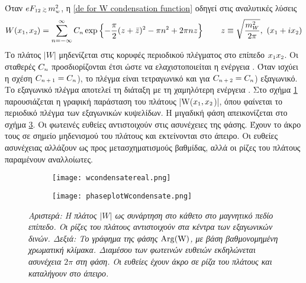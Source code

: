 Όταν $eF\subscr{12}\,{\scriptscriptstyle\gtrsim}\,m\subscr{w}\superscr{2}$, η \eqref{de for W condensation function} οδηγεί στις αναλυτικές λύσεις
\begin{equation}\label{w condensate solution}
    W(x\subscr{1},x\subscr{2})= \sum\limits_{n=-\infty}^{\infty}C\subscr{n}\exp\left\{-\frac{\pi}{2}(z+\bar{z})\superscr{2}-\pi n\superscr{2}+2\pi nz\right\}\qquad z\equiv \sqrt{\frac{m\superscr{2}\subscr{W}}{2\pi}},\,\,(x\subscr{1}+ix\subscr{2})
\end{equation}
Το πλάτος $|W|$ μηδενίζεται στις κορυφές περιοδικού πλέγματος στο επίπεδο $x\subscr{1}x\subscr{2}$. Οι σταθερές $C\subscr{n}$ προσδιορίζονται έτσι ώστε να ελαχιστοποιείται η ενέργεια \cite{chernodub}. 
Όταν ισχύει η σχέση $C\subscr{n+1}=C\subscr{n}$), το πλέγμα είναι τετραγωνικό και για $C\subscr{n+2}=C\subscr{n}$) εξαγωνικό.  
Το εξαγωνικό πλέγμα αποτελεί τη διάταξη με τη χαμηλότερη ενέργεια \cite{PhysRevD.45.3833}. Στο σχήμα \ref{fig:W condensate abs} παρουσιάζεται η γραφική παράσταση του πλάτους |W($x\subscr{1},x\subscr{2}$)|, όπου φαίνεται το περιοδικό πλέγμα των εξαγωνικών κυψελίδων. 
Η μιγαδική φάση  
απεικονίζεται 
στο σχήμα \ref{fig:W condensate phase}. Οι φωτεινές ευθείες αντιστοιχούν στις ασυνέχειες της φάσης. Έχουν το άκρο τους σε σημείο μηδενισμού του πλάτους και εκτείνονται στο άπειρο. Οι  %
ευθείες ασυνέχειας αλλάζουν ως προς μετασχηματισμούς βαθμίδας, αλλά οι ρίζες του πλάτους παραμένουν αναλλοίωτες.
\begin{english}
\begin{figure}[t] 
    \centering
    \begin{subfigure}[t]{0.54\textwidth}
        \texttt{[image: wcondensatereal.png]}
        \caption{}
        \label{fig:W condensate abs}
    \end{subfigure}
    \hfill
    \begin{subfigure}[t]{0.45\textwidth}
        \texttt{[image: phaseplotWcondensate.png]}
        \caption{}
        \label{fig:W condensate phase}
    \end{subfigure}
    \caption{\textit{Αριστερά: Η πλάτος $|W|$ ως συνάρτηση στο κάθετο στο μαγνητικό πεδίο επίπεδο. Οι ρίζες του πλάτους αντιστοιχούν στα κέντρα των εξαγωνικών δινών. Δεξιά: Το γράφημα της φάσης $\rm{Arg}(W)$, με βάση βαθμονομημένη χρωματική κλίμακα. Διαμέσου των φωτεινών ευθειών εκδηλώνεται ασυνέχεια $2\pi$ στη φάση. Οι ευθείες έχουν άκρο σε ρίζα του πλάτους και καταλήγουν στο άπειρο.}}
\end{figure}
\end{english}
\\

